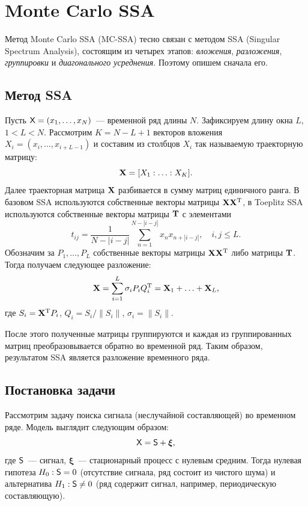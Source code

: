 \documentclass[specialist,
substylefile = spbu_report.rtx,
subf,href,colorlinks=true, 12pt]{disser}
\theoremstyle{definition}
\begin{document}
\section{Monte Carlo SSA}
Метод Monte Carlo SSA (MC-SSA) тесно связан с методом SSA (Singular Spectrum Analysis), состоящим из четырех этапов: \emph{вложения}, \emph{разложения}, \emph{группировки} и \emph{диагонального усреднения}. Поэтому опишем сначала его.
\subsection{Метод SSA}
Пусть $\mathsf{X}=(x_1,\ldots,x_N)$~--- временной ряд длины $N$. Зафиксируем длину окна $L$, $1<L<N$. Рассмотрим $K=N-L+1$ векторов вложения $X_i=(x_i,\ldots,x_{i+L-1})$ и составим из столбцов $X_i$ так называемую траекторную матрицу:
\[
	\mathbf{X} = [X_1:\ldots:X_K].
\]
Далее траекторная матрица $\mathbf{X}$ разбивается в сумму матриц единичного ранга. В базовом SSA используются собственные векторы матрицы $\mathbf{X}\mathbf{X}^{\mathrm{T}}$, в Toeplitz SSA используются собственные векторы матрицы $\mathbf{T}$ с элементами
\begin{equation}\label{eq:toeplitz}
	t_{ij} = \frac{1}{N - |i - j|}\sum_{n=1}^{N - |i - j|}x_n x_{n+|i-j|},\quad i,j\leqslant L.
\end{equation}
Обозначим за $P_1,\ldots,P_L$ собственные векторы матрицы $\mathbf{X}\mathbf{X}^{\mathrm{T}}$ либо матрицы $\mathbf{T}$. Тогда получаем следующее разложение:
\[
	\mathbf{X} = \sum_{i=1}^L \sigma_i P_i Q_i^{\mathrm{T}} = \mathbf{X}_1+\ldots+\mathbf{X}_L,
\]
где $S_i=\mathbf{X}^{\mathrm{T}} P_i$, $Q_i=S_i/\|S_i\|$, $\sigma_i=\|S_i\|$.

После этого полученные матрицы группируются и каждая из группированных матриц преобразовывается обратно во временной ряд. Таким образом, результатом SSA является разложение временного ряда.
\subsection{Постановка задачи}
Рассмотрим задачу поиска сигнала (неслучайной составляющей) во временном ряде. Модель выглядит следующим образом:
\[
	\mathsf{X}=\mathsf{S} + \bm\xi,
\]
где $\mathsf{S}$~--- сигнал, $\bm\xi$~--- стационарный процесс с нулевым средним. Тогда нулевая гипотеза $H_0:\mathsf{S}=0$ (отсутствие сигнала, ряд состоит из чистого шума) и альтернатива $H_1:\mathsf{S}\ne0$ (ряд содержит сигнал, например, периодическую составляющую).
\end{document}
